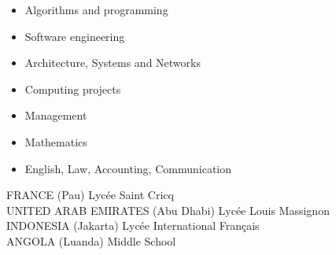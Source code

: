 \documentclass[10pt,a4paper]{altacv}
\begin{document}
\begin{itemize}
\item Algorithms and programming
\item Software engineering
\item Architecture, Systems and Networks 
\item Computing projects
\item Management
\item Mathematics
\item English, Law, Accounting, Communication
\end{itemize}
\divider

        FRANCE (Pau)  \hspace{4.7cm}  Lycée Saint Cricq \\
        UNITED ARAB EMIRATES (Abu Dhabi)  \hspace{1cm}  Lycée Louis Massignon \\
        INDONESIA (Jakarta) \hspace{3.6cm} Lycée International Français \\
        ANGOLA (Luanda) \hspace{4.1cm} Middle School\\
\divider
\medskip

\end{document}
